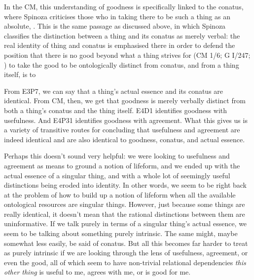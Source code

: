 \documentclass{article}
\newcommand{\dash}{\unskip{—}}
\begin{document}
In the CM, this understanding of goodness is specifically linked to the conatus, where Spinoza criticises those who  in taking there to be such a thing as an absolute, . This is the same passage as discussed above, in which Spinoza classifies the distinction between a thing and its conatus as merely verbal: the real identity of thing and conatus is emphasised there in order to defend the position that there is no good beyond what a thing strives for (CM 1/6; G \RN{1}/247; {\cite[313]{C1}}) \dash to take the good to be ontologically distinct from conatus, and from a thing itself, is to 

From E3P7, we can say that a thing's actual essence and its conatus are identical. From CM, then, we get that goodness is merely verbally distinct from both a thing's conatus and the thing itself. E4D1 identifies goodness with usefulness. And E4P31 identifies goodness with agreement. What this gives us is a variety of transitive routes for concluding that usefulness and agreement are indeed identical \dash and are also identical to goodness, conatus, and actual essence.

Perhaps this doesn't sound very helpful: we were looking to usefulness and agreement as means to ground a notion of lifeform, and we ended up with the actual essence of a singular thing, and with a whole lot of seemingly useful distinctions being eroded into identity. In other words, we seem to be right back at the problem of how to build up a notion of lifeform when all the available ontological resources are singular things. However, just because some things are really identical, it doesn't mean that the rational distinctions between them are uninformative. If we talk purely in terms of a singular thing's actual essence, we seem to be talking about something purely intrinsic. The same might, maybe somewhat less easily, be said of conatus. But all this becomes far harder to treat as purely intrinsic if we are looking through the lens of usefulness, agreement, or even the good, all of which seem to have non-trivial relational dependencies \dash \emph{this other thing} is useful to me, agrees with me, or is good for me.
\end{document}
